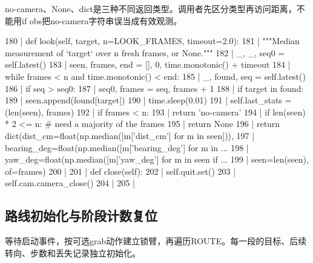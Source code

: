 no-camera、None、dict是三种不同返回类型。调用者先区分类型再访问距离，不能用if obs把no-camera字符串误当成有效观测。
\begin{CodeBlock}
 180 |     def look(self, target, n=LOOK_FRAMES, timeout=2.0):
 181 |         """Median measurement of `target` over n fresh frames, or None."""
 182 |         _, _, seq0 = self.latest()
 183 |         seen, frames, end = [], 0, time.monotonic() + timeout
 184 |         while frames < n and time.monotonic() < end:
 185 |             _, found, seq = self.latest()
 186 |             if seq > seq0:
 187 |                 seq0, frames = seq, frames + 1
 188 |                 if target in found:
 189 |                     seen.append(found[target])
 190 |             time.sleep(0.01)
 191 |         self.last_stats = (len(seen), frames)
 192 |         if frames < n:
 193 |             return 'no-camera'
 194 |         if len(seen) * 2 <= n:          # need a majority of the frames
 195 |             return None
 196 |         return dict(dist_cm=float(np.median([m['dist_cm'] for m in seen])),
 197 |                     bearing_deg=float(np.median([m['bearing_deg'] for m in  ...
 198 |                     yaw_deg=float(np.median([m['yaw_deg'] for m in seen if  ...
 199 |                     seen=len(seen), of=frames)
 200 | 
 201 |     def close(self):
 202 |         self.quit.set()
 203 |         self.cam.camera_close()
 204 | 
 205 | 
\end{CodeBlock}
\subsection{路线初始化与阶段计数复位}
等待启动事件，按可选grab动作建立锁臂，再遍历ROUTE。每一段的目标、后续转向、步数和丢失记录独立初始化。


